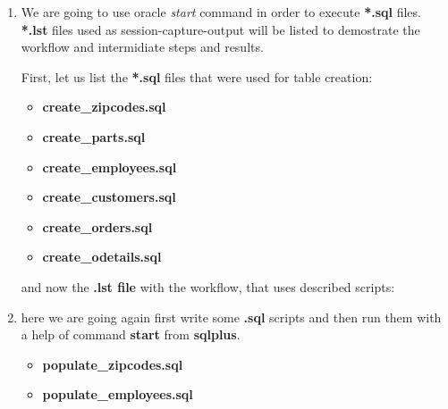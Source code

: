 \documentclass{article}
\newenvironment{answer}%
{\begin{framed}%
\vspace{0.5cm}}%
{\end{framed}\vspace{0.5cm}}
\begin{document}
	\begin{answer}
		\begin{enumerate}
			\item We are going to use oracle \emph{start} command in order to execute \textbf{*.sql} files. \textbf{*.lst} files used as session-capture-output will be listed to demostrate the workflow and intermidiate steps and results.

			First, let us list the \textbf{*.sql} files that were used for table creation:
			\begin{itemize}
				\item \textbf{create\_zipcodes.sql}
				

				\item \textbf{create\_parts.sql}
				

				\item \textbf{create\_employees.sql}
				

				\item \textbf{create\_customers.sql}
				

				\item \textbf{create\_orders.sql}
								

				\item \textbf{create\_odetails.sql}
						
			\end{itemize}

			and now the \textbf{.lst file} with the workflow, that uses described scripts:

			

			\item here we are going again first write some \textbf{.sql} scripts and then run them with a help of command \textbf{start} from \textbf{sqlplus}.

			\begin{itemize}
				\item \textbf{populate\_zipcodes.sql}
						

				\item \textbf{populate\_employees.sql}
						


\end{itemize}
\end{enumerate}
\end{answer}
\end{document}
